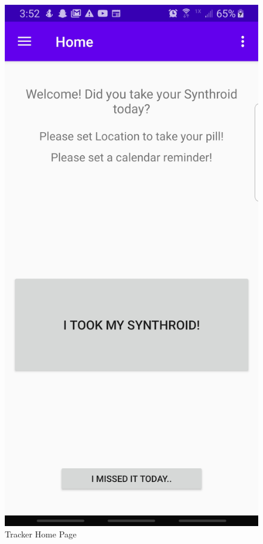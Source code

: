 \documentclass{article}
\begin{document}
\begin{figure}[H]
\centering
\includegraphics[scale= .1]{img/home.jpg}
\caption{Tracker Home Page}
\label{fig:home} 
\end{figure}
\end{document}
